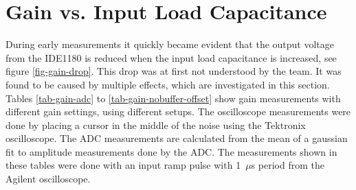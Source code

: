 \documentclass[../main/thesis.tex]{subfiles}
\begin{document}
\begin{table}[h!]
	\centering
	\caption{Configurations for different shaping times on IDE1180.}
	\label{tab-ide-shaping}
\end{table}

\newpage
\section{Gain vs. Input Load Capacitance}
\label{ide-gain}

During early measurements it quickly became evident that the output voltage from the IDE1180 is reduced when the input load capacitance is increased, see figure \ref{fig-gain-drop}. This drop was at first not understood by the team. It was found to be caused by multiple effects, which are investigated in this section. Tables \ref{tab-gain-adc} to \ref{tab-gain-nobuffer-offset} show gain measurements with different gain settings, using different setups. The oscilloscope measurements were done by placing a cursor in the middle of the noise using the Tektronix oscilloscope. The ADC measurements are calculated from the mean of a gaussian fit to amplitude measurements done by the ADC. The measurements shown in these tables were done with an input ramp pulse with 1~$\mu$s period from the Agilent oscilloscope.
\end{document}
